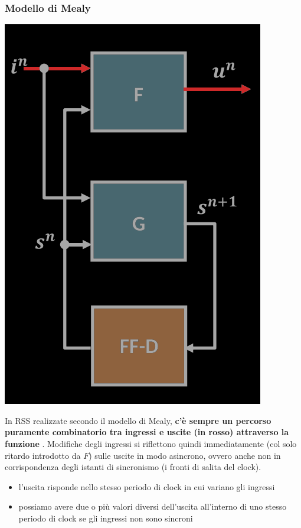 \documentclass{article}
\begin{document}
\subsubsection{Modello di Mealy}
\begin{center}
    \includegraphics[scale=0.35]{rss-mealy.png}
\end{center}
In RSS realizzate secondo il modello di Mealy, \textbf{c’è sempre un percorso puramente combinatorio tra ingressi e uscite (in rosso) attraverso la funzione} {}.
Modifiche degli ingressi si riflettono quindi immediatamente (col solo ritardo introdotto da $F$) sulle uscite in modo asincrono, ovvero anche non in corrispondenza degli istanti di sincronismo (i fronti di salita del clock).
\vspace{0.1cm}\\
\begin{itemize}
    \item l’uscita risponde nello stesso periodo di clock in cui variano gli ingressi
    \item possiamo avere due o più valori diversi dell’uscita all’interno di uno stesso periodo di clock se gli ingressi non sono sincroni
\end{itemize}
\end{document}
